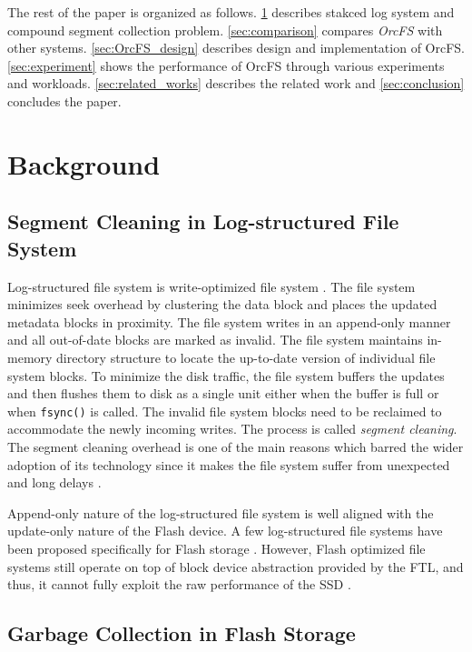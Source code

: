 \documentclass[pageno]{jpaper}
\begin{document}
The rest of the paper is organized as follows.  \cref{sec:background}
describes stakced log system and compound segment collection problem.
\cref{sec:comparison} compares \emph{OrcFS} with other systems.
\cref{sec:OrcFS_design} describes design and implementation of OrcFS.
\cref{sec:experiment} shows the performance of OrcFS through various
experiments and workloads.  \cref{sec:related_works} describes the
related work and \cref{sec:conclusion} concludes the paper.



\section{Background}
\label{sec:background}

\subsection{Segment Cleaning in Log-structured File System}

Log-structured file system is write-optimized file system
\cite{rosenblum1992design}. The file system minimizes seek overhead by
clustering the data block and places the updated metadata blocks in proximity.
The file system writes in an append-only manner and all out-of-date
blocks are marked as invalid. The file system maintains in-memory
directory structure to locate the up-to-date version of individual file
system blocks. To minimize the disk traffic, the file system buffers
the updates and then flushes them to disk as a single unit either when the
buffer is full or when \texttt{fsync()} is called.  The invalid file
system blocks need to be reclaimed to accommodate the newly incoming
writes. The process is called \emph{segment cleaning}. The segment
cleaning overhead is one of the main reasons which barred the wider
adoption of its technology since it makes the file system suffer from
unexpected and long delays \cite{seltzer1995file}.

Append-only nature of the log-structured file system is well aligned
with the update-only nature of the Flash device. A few log-structured
file systems have been proposed specifically for Flash storage
\cite{manning2010yaffs, woodhouse2001jffs, lee2015f2fs}.  However,
Flash optimized file systems still operate on top of block device
abstraction provided by the FTL, and thus, it cannot fully exploit the
raw performance of the SSD \cite{sdf}.


\subsection{Garbage Collection in Flash Storage}
\end{document}
